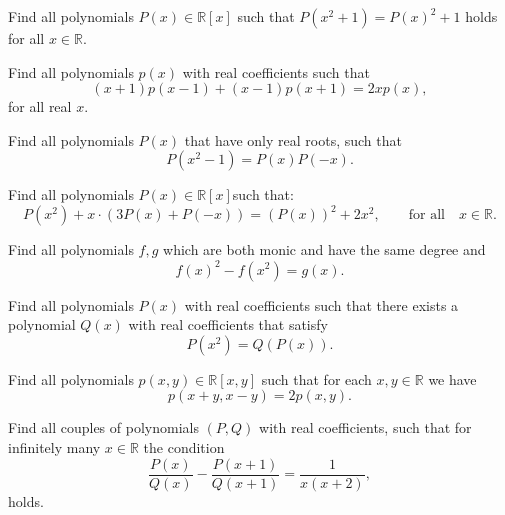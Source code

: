 \documentclass[12pt,a4paper]{memoir}
\theoremstyle{definition}
\begin{document}
\begin{question}
	Find all polynomials $P(x) \in \mathbb{R}[x]$ such that $P(x^2+1)=P(x)^2+1$ holds for all $x \in \mathbb{R}$.
\end{question}





\begin{question}
	Find all polynomials $p(x)$ with real coefficients such that
	\[ (x+1)p(x-1) + (x-1)p(x+1) = 2x p(x),  \]
	for all real $x$.
\end{question}





\begin{question}
	Find all polynomials $P(x)$ that have only real roots, such that \[ P(x^2-1)=P(x)P(-x). \]
\end{question}





\begin{question}
	Find all polynomials $P(x) \in \mathbb R[x]$such that:
	\[P(x^2)+x \cdot (3P(x)+P(-x))=(P(x))^2+2x^2, \qquad \text{for all} \quad x\in  \mathbb R.\]
\end{question}





\begin{question}
	Find all polynomials $f,g$ which are both monic and have the same degree and
	\[f(x)^2-f(x^2)=g(x).\]
\end{question}





\begin{question}
	Find all polynomials $P(x)$ with real coefficients such that there exists a polynomial $Q(x)$ with real coefficients that satisfy 
	\[P(x^2)=Q(P(x)).\]
\end{question}





\begin{question}
	Find all polynomials $p(x,y)\in\mathbb R[x,y]$ such that for each $x,y\in\mathbb R$ we have
	\[ p(x+y,x-y)=2p(x,y). \]
\end{question}





\begin{question}
	Find all couples of polynomials $(P,Q)$ with real coefficients, such that for infinitely many $x\in\mathbb R$ the condition \[ \frac{P(x)}{Q(x)}-\frac{P(x+1)}{Q(x+1)}=\frac{1}{x(x+2)},\]
	holds.
\end{question}
\end{document}
